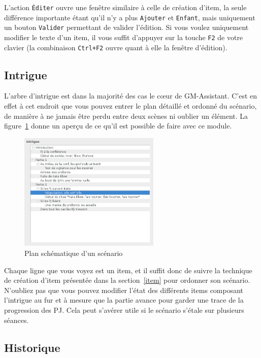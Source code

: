 \documentclass[a4paper,12pt]{article}
\newcommand*{\GMA}{GM-Assistant\xspace}
\newcommand*{\interfaceitem}[1]{\texttt{#1}}
\begin{document}
L'action \interfaceitem{Éditer} ouvre une fenêtre similaire à celle de création d'item, la seule différence importante étant qu'il n'y a plus \interfaceitem{Ajouter} et \interfaceitem{Enfant}, mais uniquement un bouton \interfaceitem{Valider} permettant de valider l'édition.
Si vous voulez uniquement modifier le texte d'un item, il vous suffit d'appuyer sur la touche \interfaceitem{F2} de votre clavier (la combinaison \interfaceitem{Ctrl+F2} ouvre quant à elle la fenêtre d'édition).

\subsection{Intrigue}
\label{sec:intrigue}

L'arbre d'intrigue est dans la majorité des cas le cœur de \GMA.
C'est en effet à cet endroit que vous pouvez entrer le plan détaillé et ordonné du scénario, de manière à ne jamais être perdu entre deux scènes ni oublier un élément.
La figure~\ref{arbre_scenar} donne un aperçu de ce qu'il est possible de faire avec ce module.
\begin{figure}[ht]
    \centerline{\includegraphics[width=0.6\textwidth]{scenario_type}}
    \caption{Plan schématique d'un scénario}
    \label{arbre_scenar}
\end{figure}
Chaque ligne que vous voyez est un item, et il suffit donc de suivre la technique de création d'item présentée dans la section~\ref{item} pour ordonner son scénario.
N'oubliez pas que vous pouvez modifier l'état des différents items composant l'intrigue au fur et à mesure que la partie avance pour garder une trace de la progression des PJ.
Cela peut s'avérer utile si le scénario s'étale sur plusieurs séances.

\subsection{Historique}
\label{sec:historique}
\end{document}
